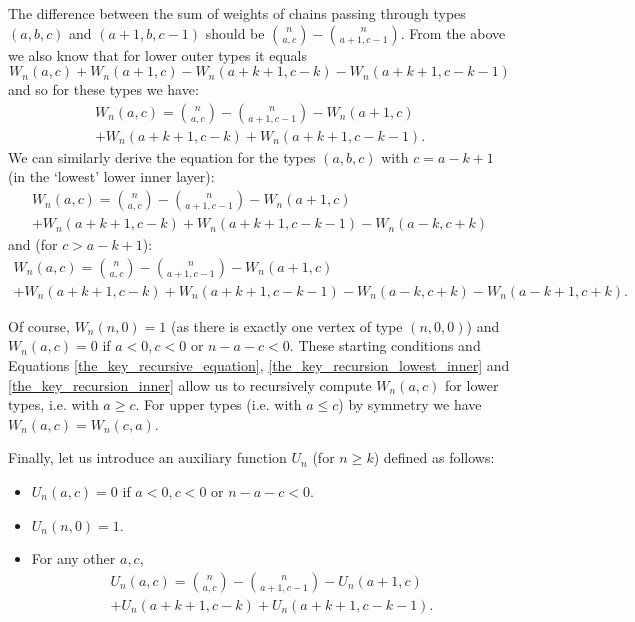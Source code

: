 \documentclass[11pt, reqno]{amsart}
\theoremstyle{remark}
\numberwithin{equation}{section}
\newcommand{\wn}{W_{n}}
\begin{document}
The difference between the sum of weights of chains passing through types $(a, b, c)$ and $(a+1, b, c-1)$ should be $\binom{n}{a, c}-\binom{n}{a+1, c-1}$. From the above we also know that for lower outer types it equals
\begin{equation*}
    \wn(a, c) + \wn(a+1, c) - \wn(a+k+1, c-k) - \wn(a+k+1, c-k-1)
\end{equation*}
and so for these types we have:
\begin{multline}
\label{the_key_recursive_equation}
    W_n(a, c) = \binom{n}{a, c} - \binom{n}{a+1, c-1} - W_n(a+1, c)\\ + W_n(a+k+1, c-k) + W_n(a+k+1, c-k-1).
\end{multline}
We can similarly derive the equation for the types $(a, b, c)$ with $c=a-k+1$ (in the `lowest' lower inner layer):
\begin{multline}
\label{the_key_recursion_lowest_inner}
    W_n(a, c) = \binom{n}{a, c} - \binom{n}{a+1, c-1} - W_n(a+1, c)\\ + W_n(a+k+1, c-k) + W_n(a+k+1, c-k-1) - W_n(a-k, c+k)
\end{multline}
and (for $c>a-k+1$):
\begin{multline}
\label{the_key_recursion_inner}
    W_n(a, c) = \binom{n}{a, c} - \binom{n}{a+1, c-1} - W_n(a+1, c)\\ + W_n(a+k+1, c-k) + W_n(a+k+1, c-k-1) - W_n(a-k, c+k) - \wn(a-k+1, c+k).
\end{multline}

Of course, $W_n(n, 0)=1$ (as there is exactly one vertex of type $(n, 0, 0)$) and $W_n(a, c)=0$ if $a<0, c<0$ or $n-a-c<0$. These starting conditions and Equations \ref{the_key_recursive_equation}, \ref{the_key_recursion_lowest_inner} and \ref{the_key_recursion_inner} allow us to recursively compute $W_n(a, c)$ for lower types, i.e. with $a \geqslant c$. For upper types (i.e. with $a \leqslant c$) by symmetry we have $W_n(a, c)=W_n(c, a)$.

Finally, let us introduce an auxiliary function $U_n$ (for $n \geqslant k$) defined as follows:
\begin{itemize}
    \item $U_n(a, c)=0$ if $a<0, c<0$ or $n-a-c<0$.
    \item $U_n(n, 0)=1$.
    \item For any other $a, c$,
    \begin{multline}
        U_n(a, c) = \binom{n}{a, c} - \binom{n}{a+1, c-1} - U_n(a+1, c)\\ + U_n(a+k+1, c-k) + U_n(a+k+1, c-k-1).
    \end{multline}
\end{itemize}
\end{document}
